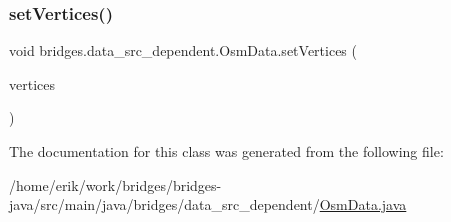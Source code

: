 \subsubsection{\texorpdfstring{set\+Vertices()}{setVertices()}}
{\footnotesize\ttfamily void bridges.\+data\+\_\+src\+\_\+dependent.\+Osm\+Data.\+set\+Vertices (\begin{DoxyParamCaption}\item[{\hyperlink{classbridges_1_1data__src__dependent_1_1_osm_vertex}{Osm\+Vertex} \mbox{[}$\,$\mbox{]}}]{vertices }\end{DoxyParamCaption})}



The documentation for this class was generated from the following file\+:\begin{DoxyCompactItemize}
\item 
/home/erik/work/bridges/bridges-\/java/src/main/java/bridges/data\+\_\+src\+\_\+dependent/\hyperlink{_osm_data_8java}{Osm\+Data.\+java}\end{DoxyCompactItemize}
